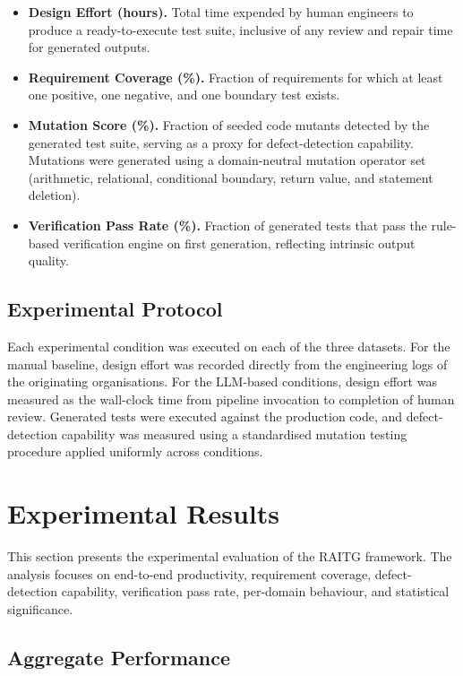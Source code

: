 \documentclass[11pt,letterpaper]{article}
\begin{document}
\begin{itemize}
\item \textbf{Design Effort (hours).} Total time expended by human engineers to produce a ready-to-execute test suite, inclusive of any review and repair time for generated outputs.
\item \textbf{Requirement Coverage (\%).} Fraction of requirements for which at least one positive, one negative, and one boundary test exists.
\item \textbf{Mutation Score (\%).} Fraction of seeded code mutants detected by the generated test suite, serving as a proxy for defect-detection capability. Mutations were generated using a domain-neutral mutation operator set (arithmetic, relational, conditional boundary, return value, and statement deletion).
\item \textbf{Verification Pass Rate (\%).} Fraction of generated tests that pass the rule-based verification engine on first generation, reflecting intrinsic output quality.
\end{itemize}

\subsection{Experimental Protocol}

Each experimental condition was executed on each of the three datasets. For the manual baseline, design effort was recorded directly from the engineering logs of the originating organisations. For the LLM-based conditions, design effort was measured as the wall-clock time from pipeline invocation to completion of human review. Generated tests were executed against the production code, and defect-detection capability was measured using a standardised mutation testing procedure applied uniformly across conditions.

\section{Experimental Results}
\label{sec:results}

This section presents the experimental evaluation of the RAITG framework. The analysis focuses on end-to-end productivity, requirement coverage, defect-detection capability, verification pass rate, per-domain behaviour, and statistical significance.

\subsection{Aggregate Performance}
\end{document}
